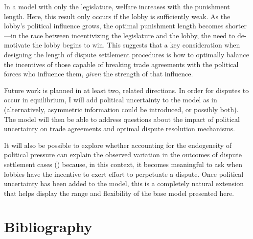 \documentclass[authoryear, review]{elsarticle}
\begin{document}
In a model with only the legislature, welfare increases with the punishment length. Here, this result only occurs if the lobby is sufficiently weak. As the lobby's political influence grows, the optimal punishment length becomes shorter---in the race between incentivizing the legislature and the lobby, the need to de-motivate the lobby begins to win. This suggests that a key consideration when designing the length of dispute settlement procedures is how to optimally balance the incentives of those capable of breaking trade agreements with the political forces who influence them, \textit{given} the strength of that influence.

Future work is planned in at least two, related directions. In order for disputes to occur in equilibrium, I will add political uncertainty to the model as in \citet{buzard2013b} (alternatively, asymmetric information could be introduced, or possibly both). The model will then be able to address questions about the impact of political uncertainty on trade agreements and optimal dispute resolution mechanisms.

It will also be possible to explore whether accounting for the endogeneity of political pressure can explain the observed variation in the outcomes of dispute settlement cases (\citet{buschrein}) because, in this context, it becomes meaningful to ask when lobbies have the incentive to exert effort to perpetuate a dispute. Once political uncertainty has been added to the model, this is a completely natural extension that helps display the range and flexibility of the base model presented here.


\section{Bibliography}

%


\newpage
\appendix
\end{document}
